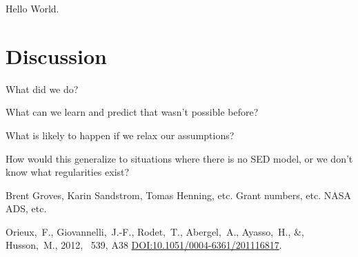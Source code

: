 \documentclass[12pt, preprint]{aastex}
\newcommand{\doi}[1]{{\footnotesize\href{http://doi.org/#1}{DOI:#1}}}
\newcommand{\acronym}[1]{{\small{#1}}}
\begin{document}
Hello World.

\section{Discussion}

What did we do?

What can we learn and predict that wasn't possible before?

What is likely to happen if we relax our assumptions?

How would this generalize to situations where there is no SED model,
or we don't know what regularities exist?

\acknowledgements
Brent Groves, Karin Sandstrom, Tomas Henning, etc.
Grant numbers, etc.
\acronym{NASA ADS}, etc.

\begin{thebibliography}{dummy}
Orieux,~F., Giovannelli,~J.-F., Rodet,~T., Abergel,~A., Ayasso,~H., \&, Husson,~M.,
2012, \aap\ 539, A38 \doi{10.1051/0004-6361/201116817}.
\end{thebibliography}
\end{document}
